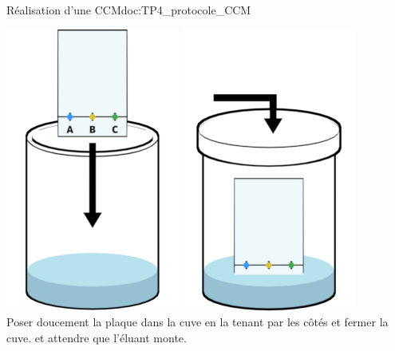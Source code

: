 \begin{doc}{Réalisation d'une CCM}{doc:TP4_protocole_CCM}
  \begin{multicols}{2}
    \begin{center}
      \includegraphics[height=0.2\textheight]{images/chimie/CCM/CCM_protocole0004.png}
      \includegraphics[height=0.2\textheight]{images/chimie/CCM/CCM_protocole0005.png} \\      
      Poser doucement la plaque dans la cuve en la tenant par les côtés et fermer la cuve.
       et attendre que l'éluant monte.
    \end{center}


\end{multicols}
\end{doc}
